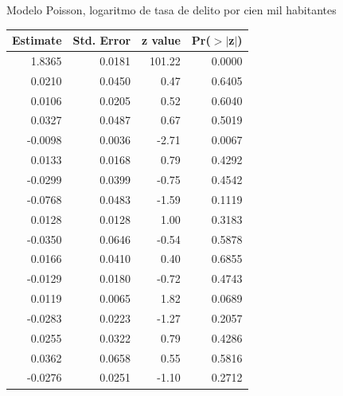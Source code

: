 \documentclass[ignorenonframetext,]{beamer}
\begin{document}
\begin{frame}{Modelo Poisson, logaritmo de tasa de delito por cien mil
habitantes}

\begin{table}[ht]
\centering
{\tiny
\begin{tabular}{rrrr}
  \hline
Estimate & Std. Error & z value & Pr($>$$|$z$|$) \\ 
  \hline
1.8365 & 0.0181 & 101.22 & 0.0000 \\ 
  0.0210 & 0.0450 & 0.47 & 0.6405 \\ 
  0.0106 & 0.0205 & 0.52 & 0.6040 \\ 
  0.0327 & 0.0487 & 0.67 & 0.5019 \\ 
  -0.0098 & 0.0036 & -2.71 & 0.0067 \\ 
  0.0133 & 0.0168 & 0.79 & 0.4292 \\ 
  -0.0299 & 0.0399 & -0.75 & 0.4542 \\ 
  -0.0768 & 0.0483 & -1.59 & 0.1119 \\ 
  0.0128 & 0.0128 & 1.00 & 0.3183 \\ 
  -0.0350 & 0.0646 & -0.54 & 0.5878 \\ 
  0.0166 & 0.0410 & 0.40 & 0.6855 \\ 
  -0.0129 & 0.0180 & -0.72 & 0.4743 \\ 
  0.0119 & 0.0065 & 1.82 & 0.0689 \\ 
  -0.0283 & 0.0223 & -1.27 & 0.2057 \\ 
  0.0255 & 0.0322 & 0.79 & 0.4286 \\ 
  0.0362 & 0.0658 & 0.55 & 0.5816 \\ 
  -0.0276 & 0.0251 & -1.10 & 0.2712 \\ 
   \hline
\end{tabular}
}
\end{table}

\end{frame}
\end{document}
